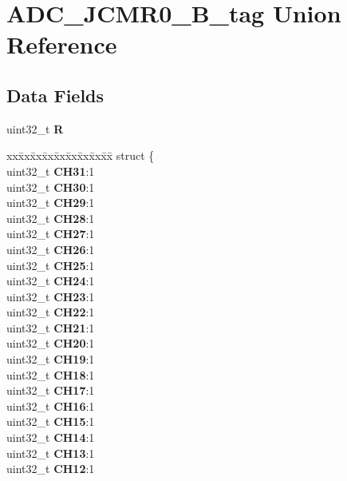 \hypertarget{unionADC__JCMR0__32B__tag}{}\section{A\+D\+C\+\_\+\+J\+C\+M\+R0\+\_\+B\+\_\+tag Union Reference}
\label{unionADC__JCMR0__32B__tag}
\subsection*{Data Fields}
\begin{DoxyCompactItemize}
\item 
\mbox{\label{unionADC__JCMR0__32B__tag_a2a3b0e10eb3825089257045104fcc698}} 
uint32\+\_\+t {\bfseries R}
\item 
\mbox{\label{unionADC__JCMR0__32B__tag_ab271686b9e3d26879f0dfda55d419ab8}} 
\begin{tabbing}
xx\=xx\=xx\=xx\=xx\=xx\=xx\=xx\=xx\=\kill
struct \{\\
\>uint32\_t {\bfseries CH31}:1\\
\>uint32\_t {\bfseries CH30}:1\\
\>uint32\_t {\bfseries CH29}:1\\
\>uint32\_t {\bfseries CH28}:1\\
\>uint32\_t {\bfseries CH27}:1\\
\>uint32\_t {\bfseries CH26}:1\\
\>uint32\_t {\bfseries CH25}:1\\
\>uint32\_t {\bfseries CH24}:1\\
\>uint32\_t {\bfseries CH23}:1\\
\>uint32\_t {\bfseries CH22}:1\\
\>uint32\_t {\bfseries CH21}:1\\
\>uint32\_t {\bfseries CH20}:1\\
\>uint32\_t {\bfseries CH19}:1\\
\>uint32\_t {\bfseries CH18}:1\\
\>uint32\_t {\bfseries CH17}:1\\
\>uint32\_t {\bfseries CH16}:1\\
\>uint32\_t {\bfseries CH15}:1\\
\>uint32\_t {\bfseries CH14}:1\\
\>uint32\_t {\bfseries CH13}:1\\
\>uint32\_t {\bfseries CH12}:1\\

\end{tabbing}
\end{DoxyCompactItemize}
